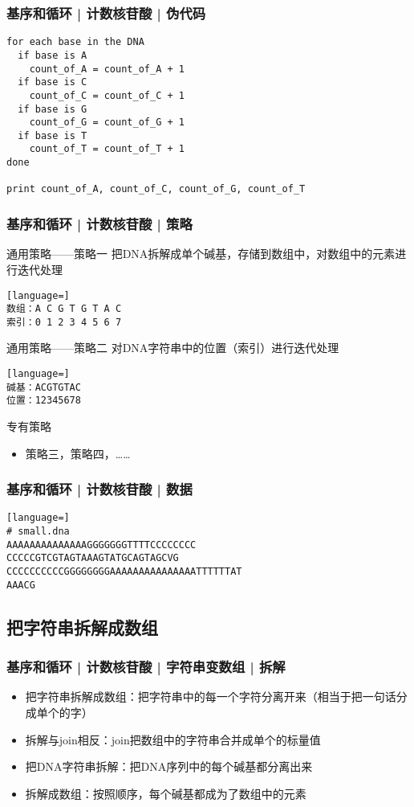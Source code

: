 \begin{frame}[fragile]
  \frametitle{基序和循环 | 计数核苷酸 | 伪代码}
\begin{lstlisting}
for each base in the DNA
  if base is A
    count_of_A = count_of_A + 1
  if base is C
    count_of_C = count_of_C + 1
  if base is G
    count_of_G = count_of_G + 1
  if base is T
    count_of_T = count_of_T + 1
done

print count_of_A, count_of_C, count_of_G, count_of_T
\end{lstlisting}
\end{frame}

\begin{frame}[fragile]
  \frametitle{基序和循环 | 计数核苷酸 | 策略}
  \begin{block}{通用策略——策略一}
    把DNA拆解成单个碱基，存储到数组中，对数组中的元素进行迭代处理
\begin{lstlisting}[language=]
数组：A C G T G T A C
索引：0 1 2 3 4 5 6 7
\end{lstlisting}
  \end{block}
  \pause
  \vspace{-0.5em}
  \begin{block}{通用策略——策略二}
    对DNA字符串中的位置（索引）进行迭代处理
\begin{lstlisting}[language=]
碱基：ACGTGTAC
位置：12345678
\end{lstlisting}
  \end{block}
  \pause
  \vspace{-0.5em}
  \begin{block}{专有策略}
    \begin{itemize}
      \item 策略三，策略四，……
    \end{itemize}
  \end{block}
\end{frame}

\begin{frame}[fragile]
  \frametitle{基序和循环 | 计数核苷酸 | 数据}
\begin{lstlisting}[language=]
# small.dna
AAAAAAAAAAAAAAGGGGGGGTTTTCCCCCCCC
CCCCCGTCGTAGTAAAGTATGCAGTAGCVG
CCCCCCCCCCGGGGGGGGAAAAAAAAAAAAAAATTTTTTAT
AAACG
\end{lstlisting}
\end{frame}

\subsection{把字符串拆解成数组}
\begin{frame}
  \frametitle{基序和循环 | 计数核苷酸 | 字符串变数组 | 拆解}
  \begin{itemize}
    \item 把字符串拆解成数组：把字符串中的每一个字符分离开来（相当于把一句话分成单个的字）
    \item 拆解与join相反：join把数组中的字符串合并成单个的标量值
    \item 把DNA字符串拆解：把DNA序列中的每个碱基都分离出来
    \item 拆解成数组：按照顺序，每个碱基都成为了数组中的元素
  \end{itemize}
\end{frame}

